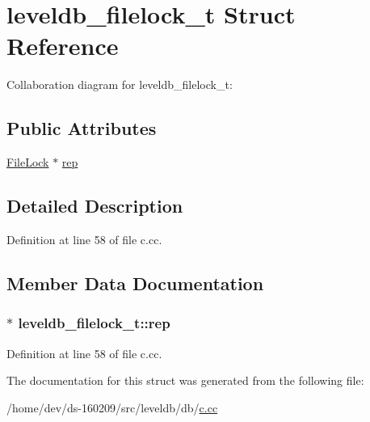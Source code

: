 \hypertarget{structleveldb__filelock__t}{}\section{leveldb\+\_\+filelock\+\_\+t Struct Reference}
\label{structleveldb__filelock__t}


Collaboration diagram for leveldb\+\_\+filelock\+\_\+t\+:
\subsection*{Public Attributes}
\begin{DoxyCompactItemize}
\item 
\hyperlink{classleveldb_1_1_file_lock}{File\+Lock} $\ast$ \hyperlink{structleveldb__filelock__t_a6c341dd7282427215e6b3ba47871a4f5}{rep}
\end{DoxyCompactItemize}


\subsection{Detailed Description}


Definition at line 58 of file c.\+cc.



\subsection{Member Data Documentation}
\hypertarget{structleveldb__filelock__t_a6c341dd7282427215e6b3ba47871a4f5}{}
\subsubsection[{rep}]{$\ast$ leveldb\+\_\+filelock\+\_\+t\+::rep}\label{structleveldb__filelock__t_a6c341dd7282427215e6b3ba47871a4f5}


Definition at line 58 of file c.\+cc.



The documentation for this struct was generated from the following file\+:\begin{DoxyCompactItemize}
\item 
/home/dev/ds-\/160209/src/leveldb/db/\hyperlink{c_8cc}{c.\+cc}\end{DoxyCompactItemize}
